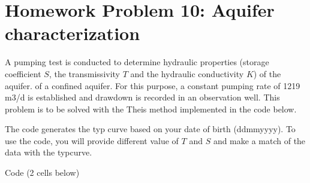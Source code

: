 \documentclass[letterpaper,10pt,english]{jupyterBook}
\begin{document}
\section{Homework Problem 10: Aquifer characterization}
\label{\detokenize{content/tutorials/T9/tutorial_09:homework-problem-10-aquifer-characterization}}
\sphinxAtStartPar
A pumping test is conducted to determine hydraulic properties (storage coefficient \(S\), the transmissivity \(T\) and the hydraulic conductivity \(K\)) of
the aquifer. of a confined aquifer. For this purpose, a constant
pumping rate of 1219 m3/d is established and drawdown is recorded in an observation well. This problem is to be
solved with the Theis method implemented in the code below.

\sphinxAtStartPar
The code generates the typ curve based on your date of birth (ddmmyyyy). To use the code, you will provide different value of \(T\) and \(S\) and make a match of the data with the typ\sphinxhyphen{}curve.

\sphinxAtStartPar
Code (2 cells below)
\end{document}
